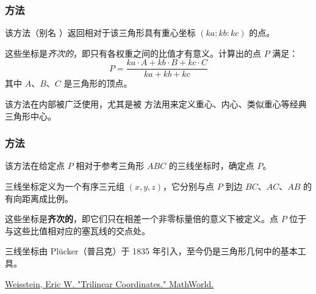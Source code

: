 \subsubsection{方法 }
\label{ssub:_triangle_barycentric_ka_kb_kc}

该方法（别名 ）返回相对于该三角形具有重心坐标 $(ka : kb : kc)$ 的点。

\medskip

这些坐标是\emph{齐次的}，即只有各权重之间的比值才有意义。计算出的点 $P$ 满足：
\[
P = \frac{ka \cdot A + kb \cdot B + kc \cdot C}{ka + kb + kc}
\]
其中 $A$、$B$、$C$ 是三角形的顶点。

\medskip

该方法在内部被广泛使用，尤其是被  方法用来定义重心、内心、类似重心等经典三角形中心。


\vspace{1em}

\begin{tkzexample}[latex=.5\textwidth]
\end{tkzexample}

\subsubsection{方法 }
\label{ssub:method_triangle_trilinear_x_y_z}

该方法在给定点 $P$ 相对于参考三角形 $ABC$ 的三线坐标时，确定点 $P$。

\medskip

三线坐标定义为一个有序三元组 $(x, y, z)$，它分别与点 $P$ 到边 $BC$、$AC$、$AB$ 的有向距离成比例。

\medskip

这些坐标是\textbf{齐次的}，即它们只在相差一个非零标量倍的意义下被定义。点 $P$ 位于与这些比值相对应的塞瓦线的交点处。

\medskip

三线坐标由 Plücker（普吕克）于 1835 年引入，至今仍是三角形几何中的基本工具。
\begin{flushright}
\small
\href{https://mathworld.wolfram.com/TrilinearCoordinates.html}{Weisstein, Eric W. "Trilinear Coordinates." MathWorld.}
\end{flushright}

